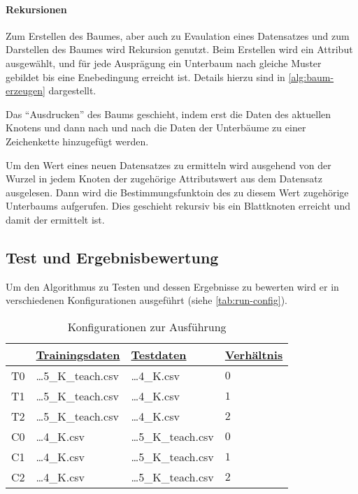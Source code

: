 \paragraph{Rekursionen}
Zum Erstellen des Baumes, aber auch zu Evaulation eines Datensatzes und zum Darstellen des Baumes wird Rekursion genutzt.
Beim Erstellen wird ein Attribut ausgewählt, und für jede Ausprägung ein Unterbaum nach gleiche Muster gebildet bis eine Enebedingung erreicht ist.
Details hierzu sind in \autoref{alg:baum-erzeugen} dargestellt.

Das \enquote{Ausdrucken} des Baums geschieht,
indem erst die Daten des aktuellen Knotens und
dann nach und nach die Daten der Unterbäume zu einer Zeichenkette hinzugefügt werden.

Um den Wert eines neuen Datensatzes zu ermitteln wird ausgehend von der Wurzel in jedem Knoten der zugehörige Attributswert aus dem Datensatz ausgelesen.
Dann wird die Bestimmungsfunktoin des zu diesem Wert zugehörige Unterbaums aufgerufen.
Dies geschieht rekursiv bis ein Blattknoten erreicht und damit der ermittelt ist.

\subsection{Test und Ergebnisbewertung}
Um den Algorithmus zu Testen und dessen Ergebnisse zu bewerten wird er in verschiedenen Konfigurationen ausgeführt (siehe \autoref{tab:run-config}).


\useunder{\uline}{\ul}{}
\begin{table}[h]
    \begin{center}
        \begin{tabular}{|l|l|l|l|}
        \hline
                               & {\ul \textbf{Trainingsdaten}} & {\ul \textbf{Testdaten}}      & {\ul \textbf{Verhältnis}} \\
            \hline
            T0                  & \dots 5\_K\_teach.csv & \dots 4\_K.csv        & $0$ \\
            \hline
            T1                  & \dots 5\_K\_teach.csv & \dots 4\_K.csv        & $1$ \\
            \hline
            T2                  & \dots 5\_K\_teach.csv & \dots 4\_K.csv        & $2$ \\
            \hline
            \hline
            C0                  & \dots 4\_K.csv        & \dots 5\_K\_teach.csv & $0$ \\
            \hline
            C1                  & \dots 4\_K.csv        & \dots 5\_K\_teach.csv & $1$ \\
            \hline
            C2                  & \dots 4\_K.csv        & \dots 5\_K\_teach.csv & $2$ \\
            \hline
        \end{tabular}
        \caption{Konfigurationen zur Ausführung}
        \label{tab:run-config}
    \end{center}
\end{table}

